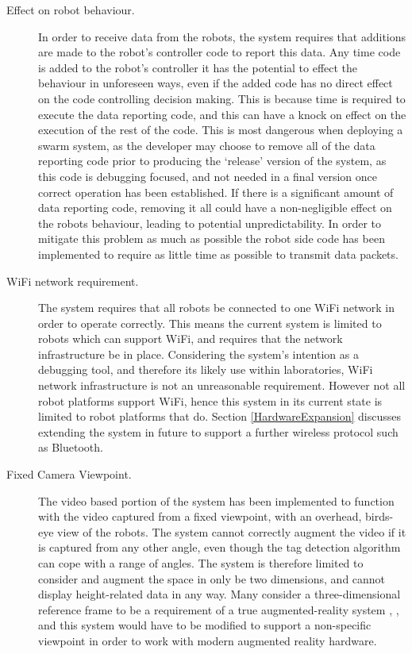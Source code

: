 \begin{description}
 \item [Effect on robot behaviour.] In order to receive data from the robots, the system requires that   additions are made to the robot's controller code to report this data. Any time code is added to the robot's controller it has the potential to effect the behaviour in unforeseen ways, even if the added code has no direct effect on the code controlling decision making. This is because time is required to execute the data reporting code, and this can have a knock on effect on the execution of the rest of the code. This is most dangerous when deploying a swarm system, as the developer may choose to remove all of the data reporting code prior to producing the `release' version of the system, as this code is debugging focused, and not needed in a final version once correct operation has been established. If there is a significant amount of data reporting code, removing it all could have a non-negligible effect on the robots behaviour, leading to potential unpredictability. In order to mitigate this problem as much as possible the robot side code has been implemented to require as little time as possible to transmit data packets.
 
\item [WiFi network requirement.] The system requires that all robots be connected to one WiFi network in order to operate correctly. This means the current system is limited to robots which can support WiFi, and requires that the network infrastructure be in place. Considering the system's intention as a debugging tool, and therefore its likely use within laboratories, WiFi network infrastructure is not an unreasonable requirement. However not all robot platforms support WiFi, hence this system in its current state is limited to robot platforms that do. Section \ref{HardwareExpansion} discusses extending the system in future to support a further wireless protocol such as Bluetooth.

\item [Fixed Camera Viewpoint.] The video based portion of the system has been implemented to function with the video captured from a fixed viewpoint, with an overhead, birds-eye view of the robots. The system cannot correctly augment the video if it is captured from any other angle, even though the tag detection algorithm can cope with a range of angles. The system is therefore limited to consider and augment the space in only be two dimensions, and cannot display height-related data in any way. Many consider a three-dimensional reference frame to be a requirement of a true augmented-reality system \cite{Azuma:1997}, \cite{Billinghurst:2014}, and this system would have to be modified to support a non-specific viewpoint in order to work with modern augmented reality hardware.
\end{description}
